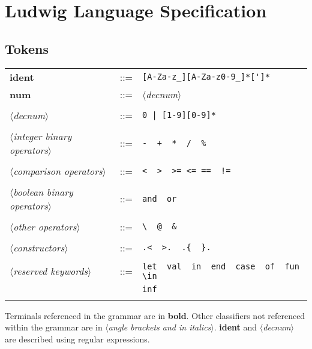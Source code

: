 \documentclass[11pt]{article}
\newcommand{\tok}[1]{$\langle$\emph{#1}$\rangle$}
\newcommand{\term}[1]{\textbf {#1}}
\begin{document}
\maketitle

\tableofcontents

\clearpage

\section{Ludwig Language Specification}

\subsection{Tokens}

\begin{small}
\begin{tabular}{lcl}
\term{ident}      &::=& \verb"[A-Za-z_][A-Za-z0-9_]*[']*"\\
\term{num}        &::=& \tok{decnum}\\
\\
\tok{decnum}    &::=& \verb"0 | [1-9][0-9]*"\\
\\
\tok{integer binary operators}
&::=& \verb"-  +  *  /  %"   \\
\\
\tok{comparison operators}
&::=& \verb"<  >  >= <= ==  !=" \\
\\
\tok{boolean binary operators}
&::=& \verb"and  or"\\
\\
\tok{other operators}
&::=& \verb"\  @  &" \\
\\
\tok{constructors}
&::=& \verb".<  >.  .{  }."\\
\\
\tok{reserved keywords}
&::=& \verb"let  val  in  end  case  of  fun  \in" \\
&   & \verb"inf"  \\
\\
\end{tabular}
\end{small}

\medskip
Terminals referenced in the grammar are in \term{bold}.
Other classifiers not referenced within the grammar are
in \tok{angle brackets and in italics}. \term{ident} and \tok{decnum} are described using
regular expressions.\\
\end{document}
